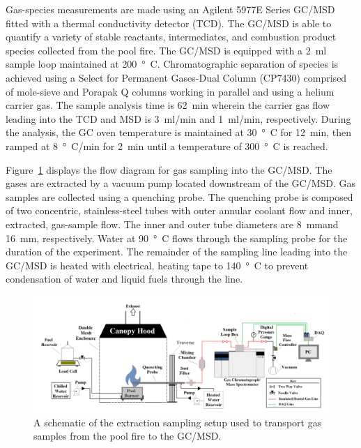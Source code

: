 \documentclass[12pt]{article}
\begin{document}
Gas-species measurements are made using an Agilent 5977E Series GC/MSD fitted with a thermal conductivity detector (TCD). The GC/MSD is able to quantify a variety of stable reactants, intermediates, and combustion product species collected from the pool fire. The GC/MSD is equipped with a \SI{2}{ml} sample loop maintained at \SI{200}{\degree C}. Chromatographic separation of species is achieved using a Select for Permanent Gases-Dual Column (CP7430) comprised of mole-sieve and Porapak Q columns working in parallel and using a helium carrier gas. The sample analysis time is \SI{62}{min} wherein the carrier gas flow leading into the TCD and MSD is \SI{3}{ml/min} and \SI{1}{ml/min}, respectively. During the analysis, the GC oven temperature is maintained at \SI{30}{\degree C} for \SI{12}{min}, then ramped at \SI{8}{\degree C/min} for \SI{2}{min} until a temperature of \SI{300}{\degree C} is reached.

Figure~\ref{fig:Experimental_Setup} displays the flow diagram for gas sampling into the GC/MSD. The gases are extracted by a vacuum pump located downstream of the GC/MSD. Gas samples are collected using a quenching probe. The quenching probe is composed of two concentric, stainless-steel tubes with outer annular coolant flow and inner, extracted, gas-sample flow. The inner and outer tube diameters are \SI{8}{mm}and \SI{16}{mm}, respectively. Water at \SI{90}{\degree C} flows through the sampling probe for the duration of the experiment. The remainder of the sampling line leading into the GC/MSD is heated with electrical, heating tape to \SI{140}{\degree C} to prevent condensation of water and liquid fuels through the line.

\begin{figure}
	\centering
\includegraphics[width=\textwidth,keepaspectratio]{Experimental_Setup.png}
	\caption[A schematic of the gas sampling procedure]{A schematic of the extraction sampling setup used to transport gas samples from the pool fire to the GC/MSD.}
	\label{fig:Experimental_Setup}
\end{figure}
\end{document}
